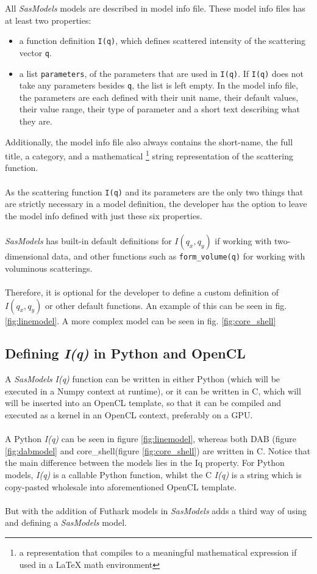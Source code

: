 \documentclass[11pt]{article}
\newcommand{\sasmodels}{\textit{SasModels}}
\newcommand{\iq}{\textit{I(q)}}
\begin{document}
All \sasmodels{} models are described in model info file. These model info 
files has at least two properties:
\begin{itemize}
  \item a function definition \texttt{I(q)}, which defines scattered intensity 
  of the scattering vector \texttt{q}.

  \item a list \texttt{parameters}, of the parameters that are used in 
  \texttt{I(q)}. If \texttt{I(q)} does not take any parameters besides 
  \texttt{q}, the list is left empty.
  In the model info file, the parameters are each defined with their unit name, 
  their default values, their value range, their type of parameter and
  a short text describing what they are.
\end{itemize}

Additionally, the model info file also always contains the short-name, 
the full title, a category, and a mathematical \footnote{a representation 
that compiles to a meaningful mathematical expression if used in a LaTeX math 
environment} string representation of the scattering function.
\\\\
As the scattering function \texttt{I(q)} and its parameters are the only 
two things that are strictly necessary in a model definition, the developer
has the option to leave the model info defined with just these six properties.
\\\\
\sasmodels{} has built-in default definitions for $I(q_x,q_y)$ if working
with two-dimensional data, and other functions such as \texttt{form\_volume(q)}
for working with voluminous scatterings.
\\\\
Therefore, it is optional for the developer to define a custom definition
of $I(q_x, q_y)$ or other default functions.
An example of this can be seen in fig. \ref{fig:linemodel}.
A more complex model can be seen in fig. \ref{fig:core_shell}

\subsection{Defining \iq{} in Python and OpenCL}
A \sasmodels{} \iq{} function can be written in either Python (which will be
executed in a Numpy context at runtime), or it can be written in C, which will
will be inserted into an OpenCL template, so that it can be compiled and 
executed as a kernel in an OpenCL context, preferably on a GPU.
\\\\
A Python \iq{} can be seen in figure \ref{fig:linemodel}, whereas both DAB 
(figure
\ref{fig:dabmodel} and core\_shell(figure \ref{fig:core_shell}) are written in C.
Notice that the main difference between the models lies in the Iq property.
For Python models, \iq{} is a callable Python function, whilst the C \iq{} is a
 string which is copy-pasted wholesale into aforementioned OpenCL template.
\\\\
But with the addition of Futhark models in \sasmodels{} adds a third way of
using and defining a \sasmodels{} model.
\end{document}
